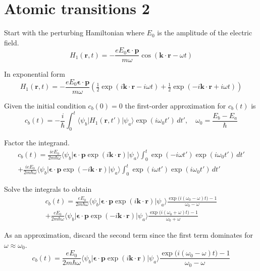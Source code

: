 

\section*{Atomic transitions 2}

Start with the perturbing Hamiltonian where $E_0$ is the amplitude of the electric field.
\begin{equation*}
H_1(\mathbf r,t)=-\frac{eE_0\boldsymbol{\epsilon}\cdot\mathbf p}{m\omega}
\cos(\mathbf k\cdot\mathbf r-\omega t)
\end{equation*}

In exponential form
\begin{equation*}
H_1(\mathbf r,t)=-\frac{eE_0\boldsymbol{\epsilon}\cdot\mathbf p}{m\omega}
\left(\tfrac{1}{2}\exp(i\mathbf k\cdot\mathbf r-i\omega t)
+\tfrac{1}{2}\exp(-i\mathbf k\cdot\mathbf r+i\omega t)\right)
\end{equation*}

Given the initial condition $c_b(0)=0$ the first-order approximation for $c_b(t)$ is
\begin{equation*}
c_b(t)=-\frac{i}{\hbar}\int_0^t
\langle\psi_b|H_1(\mathbf r,t')|\psi_a\rangle\exp(i\omega_0t')\,dt',\quad
\omega_0=\frac{E_b-E_a}{\hbar}
\end{equation*}

Factor the integrand.
\begin{multline*}
c_b(t)
=\frac{ieE_0}{2m\hbar\omega}
\langle\psi_b|\boldsymbol{\epsilon}\cdot\mathbf p\exp(i\mathbf k\cdot\mathbf r)|\psi_a\rangle
\int_0^t\exp(-i\omega t')\exp(i\omega_0t')\,dt'
\\
+\frac{ieE_0}{2m\hbar\omega}
\langle\psi_b|\boldsymbol{\epsilon}\cdot\mathbf p\exp(-i\mathbf k\cdot\mathbf r)|\psi_a\rangle
\int_0^t\exp(i\omega t')\exp(i\omega_0t')\,dt'
\end{multline*}

Solve the integrals to obtain
\begin{multline*}
c_b(t)=\frac{eE_0}{2m\hbar\omega}
\langle\psi_b|\boldsymbol{\epsilon}\cdot\mathbf p\exp(i\mathbf k\cdot\mathbf r)|\psi_a\rangle
\frac{\exp\bigl(i(\omega_0-\omega)t\bigr)-1}{\omega_0-\omega}
\\
+\frac{eE_0}{2m\hbar\omega}
\langle\psi_b|\boldsymbol{\epsilon}\cdot\mathbf p\exp(-i\mathbf k\cdot\mathbf r)|\psi_a\rangle
\frac{\exp\bigl(i(\omega_0+\omega)t\bigr)-1}{\omega_0+\omega}
\tag{1}
\end{multline*}

As an approximation, discard the second term since the first term
dominates for $\omega\approx\omega_0$.
\begin{equation*}
c_b(t)=\frac{eE_0}{2m\hbar\omega}
\langle\psi_b|\boldsymbol{\epsilon}\cdot\mathbf p\exp(i\mathbf k\cdot\mathbf r)|\psi_a\rangle
\frac{\exp\bigl(i(\omega_0-\omega)t\bigr)-1}{\omega_0-\omega}
\end{equation*}

